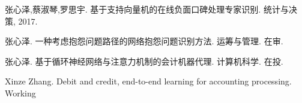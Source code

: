 
\begin{cventries}
\vspace{-1.5mm}
\cvpapers
{
    \begin{cvitems}
    \item {张心泽,蔡淑琴,罗思宇. 基于支持向量机的在线负面口碑处理专家识别\upshape{[J]}. 统计与决策, 2017.}
    \item {张心泽. 一种考虑抱怨问题路径的网络抱怨问题识别方法. 运筹与管理. 在审.}
    \item {张心泽. 基于循环神经网络与注意力机制的会计机器代理. 计算机科学. 在投.}
    \item {Xinze Zhang. Debit and credit, end-to-end learning for accounting processing. Working}
    \end{cvitems}
}
\end{cventries}